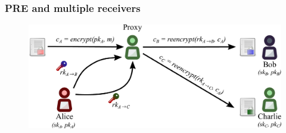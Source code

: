 \documentclass[xetex,mathsans,sans,aspectratio=169]{beamer}
\begin{document}
    \begin{frame}
        \frametitle{PRE and multiple receivers}
        \begin{figure}
            \centering
            \includegraphics[width=13cm]{pdf/pre-multi.pdf}
        \end{figure}
    \end{frame}


%
%
%
%
\end{document}

